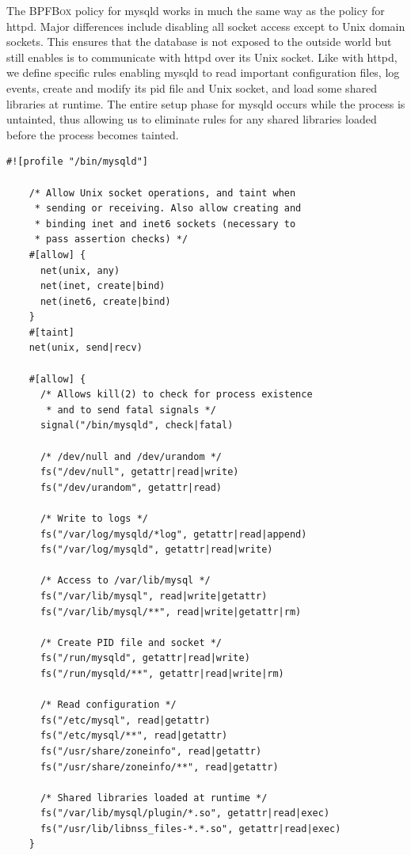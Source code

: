 \documentclass[
  fontsize=12pt,
  titlepage=firstiscover,
  paper=letter,
oneside,
  cleardoublepage=plain,
  parskip=half-,
  DIV=10,
  parindent,
  appendixprefix,
  chapterprefix,
  listof=totoc,
]{scrbook}
\newcommand{\bpfbox}{\textsc{BPFBox}}
\begin{document}
The \bpfbox{} policy for mysqld works in much the same way as the policy for httpd. Major
differences include disabling all socket access except to Unix domain sockets. This
ensures that the database is not exposed to the outside world but still enables is to
communicate with httpd over its Unix socket. Like with httpd, we define specific rules
enabling mysqld to read important configuration files, log events, create and modify its
\gls{pid} file and Unix socket, and load some shared libraries at runtime. The entire
setup phase for mysqld occurs while the process is untainted, thus allowing us to
eliminate rules for any shared libraries loaded before the process becomes tainted.

\begin{lstlisting}[language=bpfbox, gobble=4, float=false, caption={[A \bpfbox{} policy for MySQL]
  A \bpfbox{} policy for MySQL.
}, label={lst:bpfbox-mysql}]
    #![profile "/bin/mysqld"]

    /* Allow Unix socket operations, and taint when
     * sending or receiving. Also allow creating and
     * binding inet and inet6 sockets (necessary to
     * pass assertion checks) */
    #[allow] {
      net(unix, any)
      net(inet, create|bind)
      net(inet6, create|bind)
    }
    #[taint]
    net(unix, send|recv)

    #[allow] {
      /* Allows kill(2) to check for process existence
       * and to send fatal signals */
      signal("/bin/mysqld", check|fatal)

      /* /dev/null and /dev/urandom */
      fs("/dev/null", getattr|read|write)
      fs("/dev/urandom", getattr|read)

      /* Write to logs */
      fs("/var/log/mysqld/*log", getattr|read|append)
      fs("/var/log/mysqld", getattr|read|write)

      /* Access to /var/lib/mysql */
      fs("/var/lib/mysql", read|write|getattr)
      fs("/var/lib/mysql/**", read|write|getattr|rm)

      /* Create PID file and socket */
      fs("/run/mysqld", getattr|read|write)
      fs("/run/mysqld/**", getattr|read|write|rm)

      /* Read configuration */
      fs("/etc/mysql", read|getattr)
      fs("/etc/mysql/**", read|getattr)
      fs("/usr/share/zoneinfo", read|getattr)
      fs("/usr/share/zoneinfo/**", read|getattr)

      /* Shared libraries loaded at runtime */
      fs("/var/lib/mysql/plugin/*.so", getattr|read|exec)
      fs("/usr/lib/libnss_files-*.*.so", getattr|read|exec)
    }
\end{lstlisting}
\end{document}
